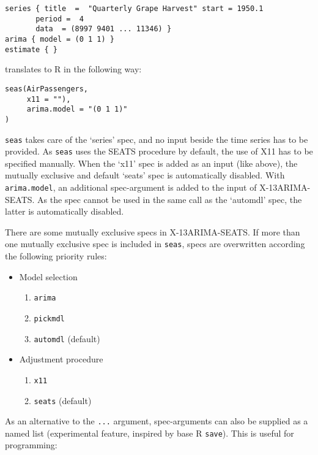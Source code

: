 \begin{verbatim}
series { title  =  "Quarterly Grape Harvest" start = 1950.1
       period =  4
       data  = (8997 9401 ... 11346) }
arima { model = (0 1 1) }
estimate { }
\end{verbatim}

translates to R in the following way:

\begin{verbatim}
seas(AirPassengers,
     x11 = ""),
     arima.model = "(0 1 1)"
)
\end{verbatim}

\texttt{seas} takes care of the `series' spec, and no input beside the
time series has to be provided. As \texttt{seas} uses the SEATS
procedure by default, the use of X11 has to be specified manually. When
the `x11' spec is added as an input (like above), the mutually exclusive
and default `seats' spec is automatically disabled. With
\texttt{arima.model}, an additional spec-argument is added to the input
of X-13ARIMA-SEATS. As the spec cannot be used in the same call as the
`automdl' spec, the latter is automatically disabled.

There are some mutually exclusive specs in X-13ARIMA-SEATS. If more than
one mutually exclusive spec is included in \texttt{seas}, specs are
overwritten according the following priority rules:

\begin{itemize}
\itemsep1pt\parskip0pt
\item
  Model selection

  \begin{enumerate}
  \def\labelenumi{\arabic{enumi}.}
  \itemsep1pt\parskip0pt
  \item
    \texttt{arima}
  \item
    \texttt{pickmdl}
  \item
    \texttt{automdl} (default)
  \end{enumerate}
\item
  Adjustment procedure

  \begin{enumerate}
  \def\labelenumi{\arabic{enumi}.}
  \itemsep1pt\parskip0pt
  \item
    \texttt{x11}
  \item
    \texttt{seats} (default)
  \end{enumerate}
\end{itemize}

As an alternative to the \texttt{...} argument, spec-arguments can also
be supplied as a named list (experimental feature, inspired by base R
\texttt{save}). This is useful for programming:

